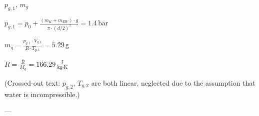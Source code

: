 \( p_{g,1} \), \( m_g \)  

\( p_{g,1} = p_0 + \frac{(m_K + m_{EW}) \cdot g}{\pi \cdot (d/2)^2} = 1.4 \, \text{bar} \)  

\( m_g = \frac{p_{g,1} \cdot V_{g,1}}{R \cdot T_{g,1}} = 5.29 \, \text{g} \)  

\( R = \frac{\bar{R}}{M_g} = 166.29 \, \frac{\text{J}}{\text{kg·K}} \)  

(Crossed-out text: \( p_{g,2} \), \( T_{g,2} \) are both linear, neglected due to the assumption that water is incompressible.)  

---